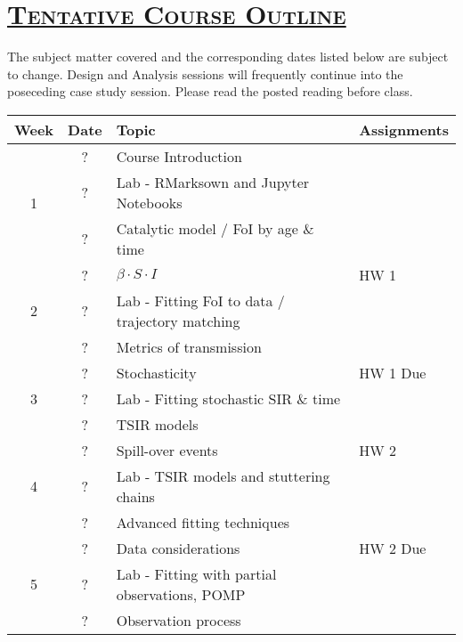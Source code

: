 \documentclass[fancyhdr,10pt]{article}
\begin{document}
\newpage
\section*{\underline{\textsc{Tentative Course Outline}}}
The subject matter covered and the corresponding dates listed below are subject to change. Design and Analysis sessions will frequently continue into the poseceding case study session.  Please read the posted reading before class.\\

\begin{center}
  \begin{tabular}{|c|c|m{3in}|l|}
    \hline
    Week                & Date  & Topic & Assignments \\\hline\hline
    \multirow{3}{*}{1}  & ?  & Course Introduction &  \\\cline{2-4}
                        & ?  & Lab - RMarksown and Jupyter Notebooks & \\\cline{2-4}
                        & ?  & Catalytic model / FoI by age $\&$ time &\\\hline\hline
    \multirow{3}{*}{2}  & ?  & $\beta \cdot S \cdot I$ &  HW 1  \\\cline{2-4}
                        & ?  & Lab - Fitting FoI to data / trajectory matching & \\\cline{2-4}
                        & ?  & Metrics of transmission &\\\hline\hline
    \multirow{3}{*}{3}  & ?  & Stochasticity & HW 1 Due \\\cline{2-4}
                        & ?  & Lab - Fitting stochastic SIR $\&$ time & \\\cline{2-4}
                        & ?  & TSIR models &\\\hline\hline
    \multirow{3}{*}{4}  & ?  & Spill-over events & HW 2  \\\cline{2-4}
                        & ?  & Lab - TSIR models and stuttering chains & \\\cline{2-4}
                        & ?  & Advanced fitting techniques &\\\hline\hline
    \multirow{3}{*}{5}  & ?  & Data considerations &  HW 2 Due   \\\cline{2-4}
                        & ?  & Lab - Fitting with partial observations, POMP & \\\cline{2-4}
                        & ?  & Observation process &\\\hline\hline

\end{tabular}
\end{center}
\end{document}
